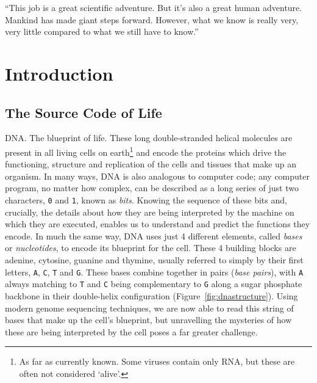 \begin{savequote}[75mm]
``This job is a great scientific adventure. But it's also a great human adventure. Mankind has made giant steps forward. However, what we know is really very, very little compared to what we still have to know.''
\end{savequote}


\chapter{Introduction}\label{introduction}
\setcounter{figure}{-1}
\setcounter{table}{-1}
\setcounter{section}{-1}
\setcounter{NAT@ctr}{-1}

\setlength\parindent{0pt}

\begin{justify}

\section{The Source Code of Life}

DNA\@. The blueprint of life. These long double-stranded helical molecules are present in all living cells on earth\footnote{As far as currently known. Some viruses contain only RNA, but these are often not considered `alive'.} and encode the proteins which drive the functioning, structure and replication of the cells and tissues that make up an organism. In many ways, DNA is also analogous to computer code; any computer program, no matter how complex, can be described as a long series of just two characters, \verb+0+ and \verb+1+, known as \emph{bits}. Knowing the sequence of these bits and, crucially, the details about how they are being interpreted by the machine on which they are executed, enables us to understand and predict the functions they encode. In much the same way, DNA uses just 4 different elements, called \emph{bases} or \emph{nucleotides}, to encode its blueprint for the cell. These 4 building blocks are adenine, cytosine, guanine and thymine, usually referred to simply by their first letters, \verb+A+, \verb+C+, \verb+T+ and \verb+G+. These bases combine together in pairs (\emph{base pairs}), with \verb+A+ always matching to \verb+T+ and \verb+C+ being complementary to \verb+G+ along a sugar phosphate backbone in their double-helix configuration (Figure~\ref{fig:dnastructure}). Using modern genome sequencing techniques, we are now able to read this string of bases that make up the cell's blueprint, but unravelling the mysteries of how these are being interpreted by the cell poses a far greater challenge.

\end{justify}


